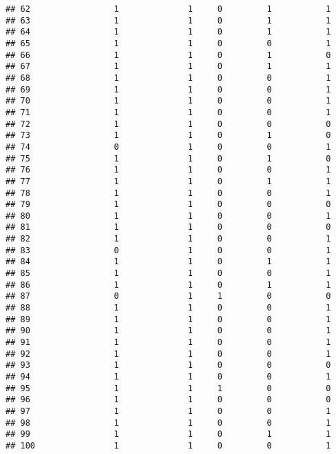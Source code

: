 \documentclass[]{article}
\begin{document}
\begin{verbatim}
## 62                 1              1     0         1           1
## 63                 1              1     0         1           1
## 64                 1              1     0         1           1
## 65                 1              1     0         0           1
## 66                 1              1     0         1           0
## 67                 1              1     0         1           1
## 68                 1              1     0         0           1
## 69                 1              1     0         0           1
## 70                 1              1     0         0           1
## 71                 1              1     0         0           1
## 72                 1              1     0         0           0
## 73                 1              1     0         1           0
## 74                 0              1     0         0           1
## 75                 1              1     0         1           0
## 76                 1              1     0         0           1
## 77                 1              1     0         1           1
## 78                 1              1     0         0           1
## 79                 1              1     0         0           0
## 80                 1              1     0         0           1
## 81                 1              1     0         0           0
## 82                 1              1     0         0           1
## 83                 0              1     0         0           1
## 84                 1              1     0         1           1
## 85                 1              1     0         0           1
## 86                 1              1     0         1           1
## 87                 0              1     1         0           0
## 88                 1              1     0         0           1
## 89                 1              1     0         0           1
## 90                 1              1     0         0           1
## 91                 1              1     0         0           1
## 92                 1              1     0         0           1
## 93                 1              1     0         0           0
## 94                 1              1     0         0           1
## 95                 1              1     1         0           0
## 96                 1              1     0         0           0
## 97                 1              1     0         0           1
## 98                 1              1     0         0           1
## 99                 1              1     0         1           1
## 100                1              1     0         0           1

\end{verbatim}
\end{document}
